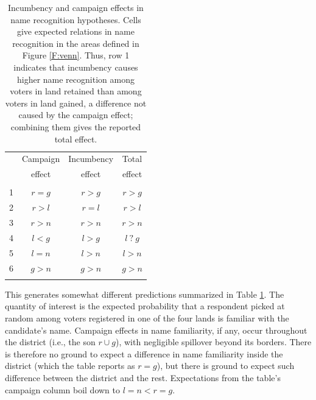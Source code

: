 \documentclass[letter,12pt]{article}
\begin{document}
\begin{table}
  \centering
  \begin{tabular}{cccc}
      & Campaign & Incumbency &  Total   \\ [-.5ex]
      & effect   & effect     &  effect  \\ \hline
    \\ [-1.2ex]
    1 & $r=g$    & $r>g$      &  $r>g$   \\
    2 & $r>l$    & $r=l$      &  $r>l$   \\
    3 & $r>n$    & $r>n$      &  $r>n$   \\
    4 & $l<g$    & $l>g$      &  $l~?~g$ \\ %
    5 & $l=n$    & $l>n$      &  $l>n$   \\
    6 & $g>n$    & $g>n$      &  $g>n$   \\ \\ [-1.2ex] \hline 
  \end{tabular}
  \caption{Incumbency and campaign effects in name recognition hypotheses. Cells give expected relations in name recognition in the areas defined in Figure \ref{F:venn}. Thus, row 1 indicates that incumbency causes higher name recognition among voters in land retained than among voters in land gained, a difference not caused by the campaign effect; combining them gives the reported total effect.}\label{T:hyps}
\end{table}

This generates somewhat different predictions summarized in Table \ref{T:hyps}. The quantity of interest is the expected probability that a respondent picked at random among voters registered in one of the four lands is familiar with the candidate's name. Campaign effects in name familiarity, if any, occur throughout the district (i.e., the son $r \cup g$), with negligible spillover beyond its borders. There is therefore no ground to expect a difference in name familiarity inside the district (which the table reports as $r=g$), but there is ground to expect such difference between the district and the rest. Expectations from the table's campaign column boil down to $l=n<r=g$. %
\end{document}
